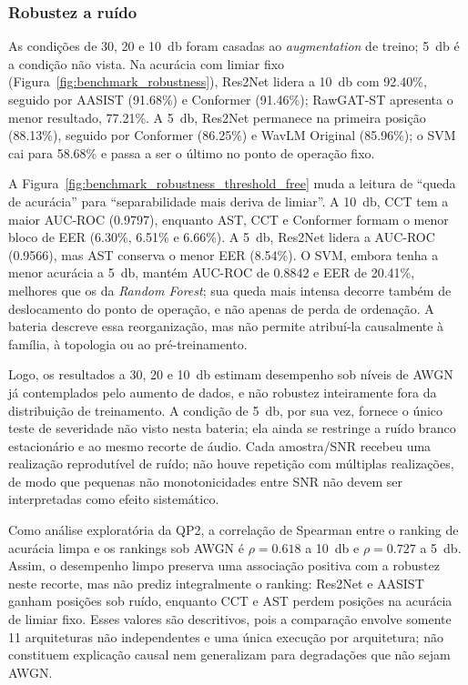 \documentclass[12pt,a4paper]{article}
\begin{document}
\subsubsection{Robustez a ruído}
\label{sec:snr5}

As condições de 30, 20 e \SI{10}{\decibel} foram casadas ao \textit{augmentation}
de treino; \SI{5}{\decibel} é a condição não vista. Na acurácia com limiar
fixo (Figura~\ref{fig:benchmark_robustness}), Res2Net lidera a
\SI{10}{\decibel} com \num{92,40}\%, seguido por AASIST (\num{91,68}\%) e
Conformer (\num{91,46}\%); RawGAT-ST apresenta o menor resultado,
\num{77,21}\%. A \SI{5}{\decibel}, Res2Net permanece na primeira posição
(\num{88,13}\%), seguido por Conformer (\num{86,25}\%) e WavLM Original
(\num{85,96}\%); o SVM cai para \num{58,68}\% e passa a ser o último no
ponto de operação fixo.

A Figura~\ref{fig:benchmark_robustness_threshold_free} muda a leitura de
``queda de acurácia'' para ``separabilidade mais deriva de limiar''. A
\SI{10}{\decibel}, CCT tem a maior AUC-ROC (\num{0,9797}), enquanto AST,
CCT e Conformer formam o menor bloco de EER (\num{6,30}\%, \num{6,51}\% e
\num{6,66}\%). A \SI{5}{\decibel}, Res2Net lidera a AUC-ROC
(\num{0,9566}), mas AST conserva o menor EER (\num{8,54}\%). O SVM, embora
tenha a menor acurácia a \SI{5}{\decibel}, mantém AUC-ROC de \num{0,8842} e
EER de \num{20,41}\%, melhores que os da \textit{Random Forest}; sua queda
mais intensa decorre também de deslocamento do ponto de operação, e não apenas
de perda de ordenação. A bateria descreve essa reorganização, mas não permite
atribuí-la causalmente à família, à topologia ou ao pré-treinamento.

Logo, os resultados a 30, 20 e \SI{10}{\decibel} estimam desempenho sob níveis
de AWGN já contemplados pelo aumento de dados, e não robustez inteiramente fora
da distribuição de treinamento. A condição de \SI{5}{\decibel}, por sua vez,
fornece o único teste de severidade não visto nesta bateria; ela ainda se
restringe a ruído branco estacionário e ao mesmo recorte de áudio. Cada
amostra/SNR recebeu uma realização reprodutível de ruído; não houve repetição
com múltiplas realizações, de modo que pequenas não monotonicidades entre SNR
não devem ser interpretadas como efeito sistemático.

Como análise exploratória da QP2, a correlação de Spearman entre o ranking de
acurácia limpa e os rankings sob AWGN é $\rho=\num{0,618}$ a
\SI{10}{\decibel} e $\rho=\num{0,727}$ a \SI{5}{\decibel}. Assim, o
desempenho limpo preserva uma associação positiva com a robustez neste recorte,
mas não prediz integralmente o ranking: Res2Net e AASIST ganham posições sob
ruído, enquanto CCT e AST perdem posições na acurácia de limiar fixo. Esses valores
são descritivos, pois a comparação envolve somente \num{11} arquiteturas não
independentes e uma única execução por arquitetura; não constituem explicação
causal nem generalizam para degradações que não sejam AWGN.
\end{document}
